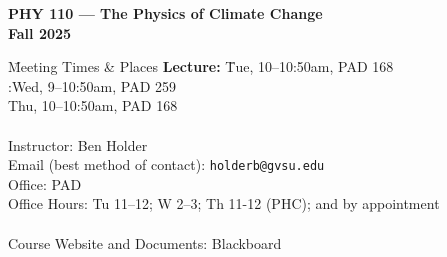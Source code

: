 \documentclass{article}
\begin{document}
\begin{center}
{\bf \Large
PHY 110 --- The Physics of Climate Change\\[6pt]
Fall 2025
}
\end{center}

\vspace{0.5cm}
\begin{center}
\begin{tabbing}
\hspace{2cm} \= Meeting Times \& Places \hspace{2cm} \={\bf Lecture:} \hspace{0.5cm} \=Tue, 10--10:50am, PAD 168\\
\> :\>Wed, 9--10:50am, PAD 259\\
\>\>Thu, 10--10:50am, PAD 168\\
\\
\> Instructor: \> Ben Holder\\
\> Email (best method of contact): \> {\tt holderb@gvsu.edu}\\
\> Office:  PAD\\
\> Office Hours: \> Tu 11--12; W 2--3; Th 11-12 (PHC); and by appointment\\
\\
\> Course Website and Documents: \> Blackboard
\end{tabbing}
\end{center}
\end{document}
